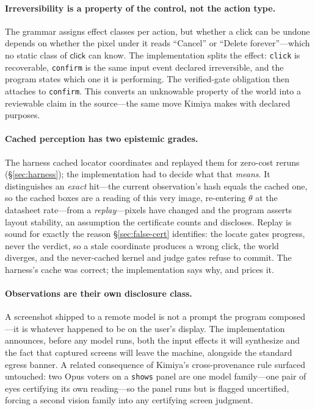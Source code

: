 \documentclass[acmsmall,screen,nonacm]{acmart}
\newcommand{\conf}{\theta}
\theoremstyle{acmdefinition}%
\theoremstyle{acmplain}%
\begin{document}
\paragraph{Irreversibility is a property of the control, not the action
type.} The grammar assigns effect classes per action, but whether a
click can be undone depends on whether the pixel under it reads
``Cancel'' or ``Delete forever''---which no static class of
$\mathsf{click}$ can know. The implementation splits the effect:
\texttt{click} is recoverable, \texttt{confirm} is the same input event
declared irreversible, and the program states which one it is
performing. The verified-gate obligation then attaches to
\texttt{confirm}. This converts an unknowable property of the world into
a reviewable claim in the source---the same move Kimiya makes with
declared purposes.

\paragraph{Cached perception has two epistemic grades.} The harness
cached locator coordinates and replayed them for zero-cost reruns
(\S\ref{sec:harness}); the implementation had to decide what that
\emph{means}. It distinguishes an \emph{exact} hit---the current
observation's hash equals the cached one, so the cached boxes are a
reading of this very image, re-entering $\conf$ at the datasheet
rate---from a \emph{replay}---pixels have changed and the program
asserts layout stability, an assumption the certificate counts and
discloses. Replay is sound for exactly the reason
\S\ref{sec:false-cert} identifies: the locate gates progress, never the
verdict, so a stale coordinate produces a wrong click, the world
diverges, and the never-cached kernel and judge gates refuse to commit.
The harness's cache was correct; the implementation says why, and prices
it.

\paragraph{Observations are their own disclosure class.} A screenshot
shipped to a remote model is not a prompt the program composed---it is
whatever happened to be on the user's display. The implementation
announces, before any model runs, both the input effects it will
synthesize and the fact that captured screens will leave the machine,
alongside the standard egress banner. A related consequence of Kimiya's
cross-provenance rule surfaced untouched: two Opus voters on a
\texttt{shows} panel are one model family---one pair of eyes certifying
its own reading---so the panel runs but is flagged uncertified, forcing
a second vision family into any certifying screen judgment.
\end{document}
